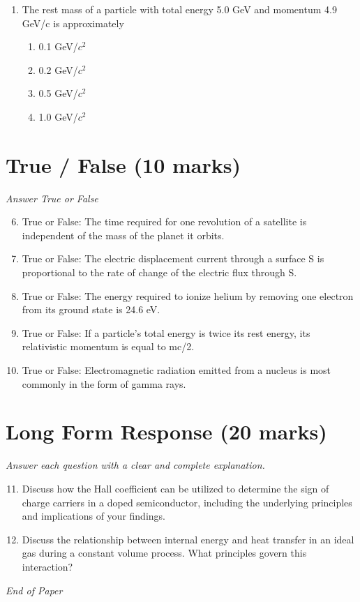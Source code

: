 \documentclass[12pt]{article}
\begin{document}
\begin{enumerate}[label=\arabic*.]
\begin{enumerate}[label=(\alph*)]
    \item decreased by a factor of 49
    \item decreased by a factor of 81
    \item increased by a factor of 9
\end{enumerate}
\item The rest mass of a particle with total energy 5.0 GeV and momentum 4.9 GeV/c is approximately
\begin{enumerate}[label=(\alph*)]
    \item 0.1 GeV/$c^2$
    \item 0.2 GeV/$c^2$
    \item 0.5 GeV/$c^2$
    \item 1.0 GeV/$c^2$
\end{enumerate}
\end{enumerate}

\section*{True / False (10 marks)}
\textit{Answer True or False}
\begin{enumerate}[label=\arabic*.]
\setcounter{enumi}{5}
\item True or False: The time required for one revolution of a satellite is independent of the mass of the planet it orbits.
\item True or False: The electric displacement current through a surface S is proportional to the rate of change of the electric flux through S.
\item True or False: The energy required to ionize helium by removing one electron from its ground state is 24.6 eV.
\item True or False: If a particle's total energy is twice its rest energy, its relativistic momentum is equal to mc/2.
\item True or False: Electromagnetic radiation emitted from a nucleus is most commonly in the form of gamma rays.
\end{enumerate}

\section*{Long Form Response (20 marks)}
\textit{Answer each question with a clear and complete explanation.}
\begin{enumerate}[label=\arabic*.]
\setcounter{enumi}{10}
\item Discuss how the Hall coefficient can be utilized to determine the sign of charge carriers in a doped semiconductor, including the underlying principles and implications of your findings.
\item Discuss the relationship between internal energy and heat transfer in an ideal gas during a constant volume process. What principles govern this interaction?
\end{enumerate}

\vfill
\noindent\textit{End of Paper}
\end{document}
